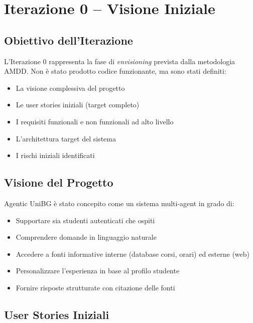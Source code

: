 \documentclass[a4paper,12pt]{report}
\begin{document}
\chapter{Iterazione 0 -- Visione Iniziale}

\section{Obiettivo dell'Iterazione}

L'Iterazione 0 rappresenta la fase di \textit{envisioning} prevista dalla metodologia AMDD. Non è stato prodotto codice funzionante, ma sono stati definiti:
\begin{itemize}
    \item La visione complessiva del progetto
    \item Le user stories iniziali (target completo)
    \item I requisiti funzionali e non funzionali ad alto livello
    \item L'architettura target del sistema
    \item I rischi iniziali identificati
\end{itemize}

\section{Visione del Progetto}

Agentic UniBG è stato concepito come un sistema multi-agent in grado di:
\begin{itemize}
    \item Supportare sia studenti autenticati che ospiti
    \item Comprendere domande in linguaggio naturale
    \item Accedere a fonti informative interne (database corsi, orari) ed esterne (web)
    \item Personalizzare l'esperienza in base al profilo studente
    \item Fornire risposte strutturate con citazione delle fonti
\end{itemize}

\section{User Stories Iniziali}
\end{document}
